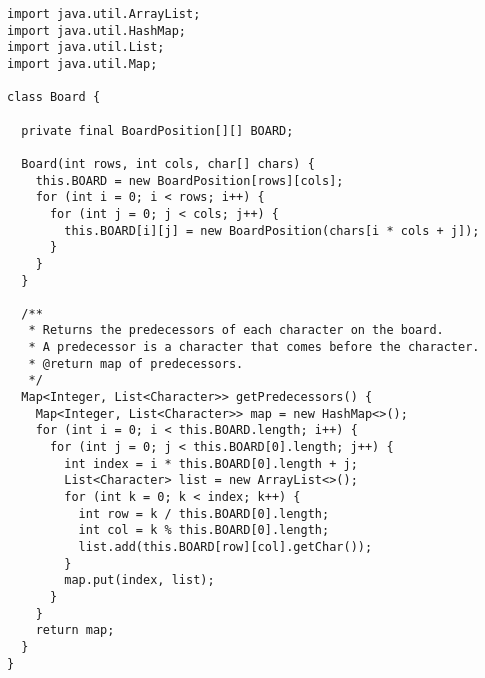 \begin{lstlisting}[language=MyJava]
import java.util.ArrayList;
import java.util.HashMap;
import java.util.List;
import java.util.Map;

class Board {

  private final BoardPosition[][] BOARD;

  Board(int rows, int cols, char[] chars) {
    this.BOARD = new BoardPosition[rows][cols];
    for (int i = 0; i < rows; i++) {
      for (int j = 0; j < cols; j++) {
        this.BOARD[i][j] = new BoardPosition(chars[i * cols + j]);
      }
    }
  }

  /**
   * Returns the predecessors of each character on the board.
   * A predecessor is a character that comes before the character.
   * @return map of predecessors.
   */
  Map<Integer, List<Character>> getPredecessors() {
    Map<Integer, List<Character>> map = new HashMap<>();
    for (int i = 0; i < this.BOARD.length; i++) {
      for (int j = 0; j < this.BOARD[0].length; j++) {
        int index = i * this.BOARD[0].length + j;
        List<Character> list = new ArrayList<>();
        for (int k = 0; k < index; k++) {
          int row = k / this.BOARD[0].length;
          int col = k % this.BOARD[0].length;
          list.add(this.BOARD[row][col].getChar());
        }
        map.put(index, list);
      }
    }
    return map;
  }
}
\end{lstlisting}








